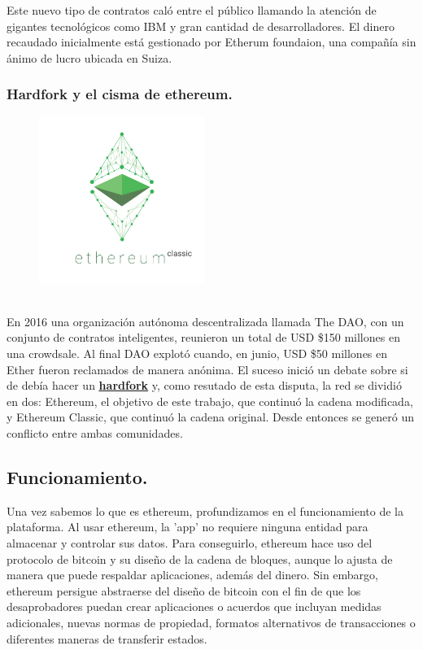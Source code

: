 \documentclass[11pt,a4paper]{article}
\begin{document}
Este nuevo tipo de contratos caló entre el público llamando la atención de gigantes tecnológicos como IBM y gran cantidad de desarrolladores. El dinero recaudado inicialmente está gestionado por Etherum foundaion\footnotemark, una compañía sin ánimo de lucro ubicada en Suiza.	\\


\subsubsection{Hardfork y el cisma de ethereum.}
\label{sec:dao}
\begin{figure}
  \caption{\ \ }
  \includegraphics[width=5.4cm]{images/classic1.png}
\end{figure} 
En 2016 una organización autónoma descentralizada llamada The DAO, con un conjunto de contratos inteligentes, reunieron un total de USD \$150 millones en una crowdsale. Al final DAO explotó cuando, en junio, USD \$50 millones en Ether fueron reclamados de manera anónima. El suceso inició un debate sobre si de debía hacer un 
\hyperref[sec:hardfork]{\textbf{\underline{hardfork}}} y, como resutado de esta disputa, la red se dividió en dos: Ethereum, el objetivo de este trabajo, que continuó la cadena modificada, y Ethereum Classic, que continuó la cadena original. Desde entonces se generó un conflicto entre ambas comunidades.\\


\subsection{Funcionamiento.\\} 
Una vez sabemos lo que es ethereum, profundizamos en el funcionamiento de la plataforma.
Al usar ethereum, la 'app' no requiere ninguna entidad para almacenar y controlar sus datos. Para conseguirlo, ethereum hace uso del protocolo de bitcoin y su diseño de la cadena de bloques, aunque lo ajusta de manera que puede respaldar aplicaciones, además del dinero. Sin embargo, ethereum persigue abstraerse del diseño de bitcoin con el fin de que los desaprobadores puedan crear aplicaciones o acuerdos que incluyan medidas adicionales, nuevas normas de propiedad, formatos alternativos de transacciones o diferentes maneras de transferir estados.\\
\end{document}
